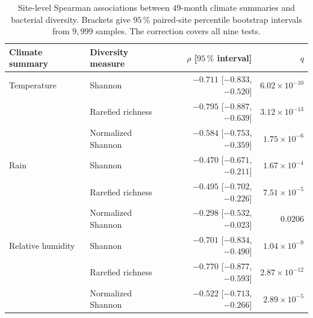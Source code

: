\begin{table}[H]
\centering\small
\caption{Site-level Spearman associations between $49$-month climate summaries
and bacterial diversity. Brackets give $95\,\%$ paired-site percentile
bootstrap intervals from $9{,}999$ samples. The correction covers all nine tests.}
\label{tab:climate-alpha}
\begin{tabular}{llrr}
\toprule
Climate summary & Diversity measure & $\rho$ [$95\,\%$ interval] & $q$ \\
\midrule
Temperature & Shannon & $-0.711$ [$-0.833$,$-0.520$] & $6.02\times10^{-10}$ \\
 & Rarefied richness & $-0.795$ [$-0.887$,$-0.639$] & $3.12\times10^{-13}$ \\
 & Normalized Shannon & $-0.584$ [$-0.753$,$-0.359$] & $1.75\times10^{-6}$ \\
Rain & Shannon & $-0.470$ [$-0.671$,$-0.211$] & $1.67\times10^{-4}$ \\
 & Rarefied richness & $-0.495$ [$-0.702$,$-0.226$] & $7.51\times10^{-5}$ \\
 & Normalized Shannon & $-0.298$ [$-0.532$,$-0.023$] & $0.0206$ \\
Relative humidity & Shannon & $-0.701$ [$-0.834$,$-0.490$] & $1.04\times10^{-9}$ \\
 & Rarefied richness & $-0.770$ [$-0.877$,$-0.593$] & $2.87\times10^{-12}$ \\
 & Normalized Shannon & $-0.522$ [$-0.713$,$-0.266$] & $2.89\times10^{-5}$ \\
\bottomrule
\end{tabular}
\end{table}